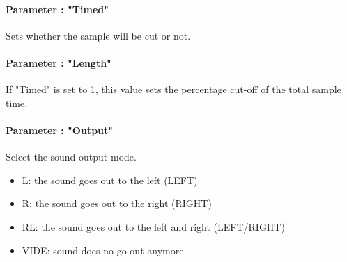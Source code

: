 \paragraph{Parameter : "Timed"} Sets whether the sample will be cut or not.

\paragraph{Parameter : "Length"} If "Timed" is set to 1, this value sets the percentage cut-off of the total sample time.

\paragraph{Parameter : "Output"} Select the sound output mode.
\medskip

\begin{itemize}
    \item{L: the sound goes out to the left (LEFT)}
    \item{R: the sound goes out to the right (RIGHT)}
    \item{RL: the sound goes out to the left and right (LEFT/RIGHT)}
    \item{VIDE: sound does no go out anymore}
\end{itemize}
